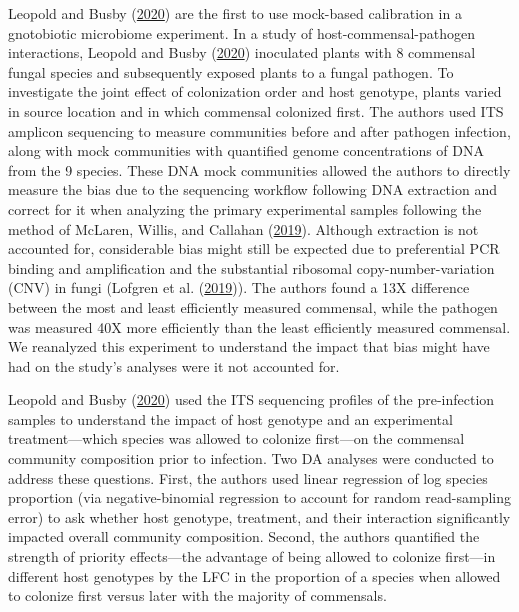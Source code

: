 \documentclass[
]{article}
\begin{document}
Leopold and Busby (\protect\hyperlink{ref-leopold2020host}{2020}) are the first to use mock-based calibration in a gnotobiotic microbiome experiment.
In a study of host-commensal-pathogen interactions, Leopold and Busby (\protect\hyperlink{ref-leopold2020host}{2020}) inoculated plants with 8 commensal fungal species and subsequently exposed plants to a fungal pathogen.
To investigate the joint effect of colonization order and host genotype, plants varied in source location and in which commensal colonized first.
The authors used ITS amplicon sequencing to measure communities before and after pathogen infection, along with mock communities with quantified genome concentrations of DNA from the 9 species.
These DNA mock communities allowed the authors to directly measure the bias due to the sequencing workflow following DNA extraction and correct for it when analyzing the primary experimental samples following the method of McLaren, Willis, and Callahan (\protect\hyperlink{ref-mclaren2019cons}{2019}).
Although extraction is not accounted for, considerable bias might still be expected due to preferential PCR binding and amplification and the substantial ribosomal copy-number-variation (CNV) in fungi (Lofgren et al. (\protect\hyperlink{ref-lofgren2019geno}{2019})).
The authors found a 13X difference between the most and least efficiently measured commensal, while the pathogen was measured 40X more efficiently than the least efficiently measured commensal.
We reanalyzed this experiment to understand the impact that bias might have had on the study's analyses were it not accounted for.

Leopold and Busby (\protect\hyperlink{ref-leopold2020host}{2020}) used the ITS sequencing profiles of the pre-infection samples to understand the impact of host genotype and an experimental treatment---which species was allowed to colonize first---on the commensal community composition prior to infection.
Two DA analyses were conducted to address these questions.
First, the authors used linear regression of log species proportion (via negative-binomial regression to account for random read-sampling error) to ask whether host genotype, treatment, and their interaction significantly impacted overall community composition.
Second, the authors quantified the strength of priority effects---the advantage of being allowed to colonize first---in different host genotypes by the LFC in the proportion of a species when allowed to colonize first versus later with the majority of commensals.
\end{document}
